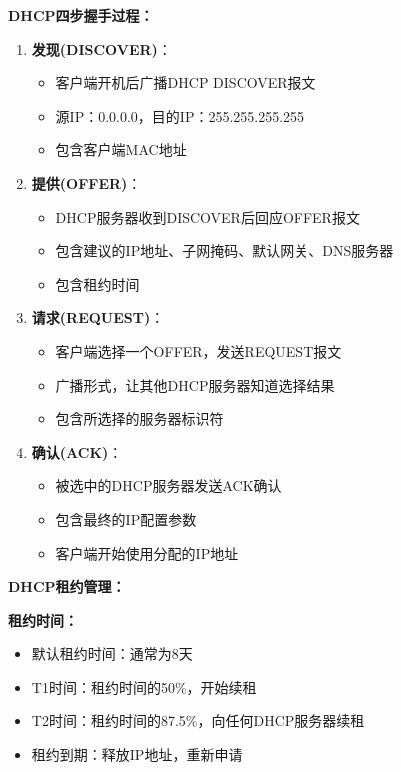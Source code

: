 \documentclass[lang=cn,newtx,10pt,scheme=chinese]{../../elegantbook}
\begin{document}
\textbf{DHCP四步握手过程：}
\begin{enumerate}
  \item \textbf{发现(DISCOVER)}：
    \begin{itemize}
      \item 客户端开机后广播DHCP DISCOVER报文
      \item 源IP：0.0.0.0，目的IP：255.255.255.255
      \item 包含客户端MAC地址
    \end{itemize}
    
  \item \textbf{提供(OFFER)}：
    \begin{itemize}
      \item DHCP服务器收到DISCOVER后回应OFFER报文
      \item 包含建议的IP地址、子网掩码、默认网关、DNS服务器
      \item 包含租约时间
    \end{itemize}
    
  \item \textbf{请求(REQUEST)}：
    \begin{itemize}
      \item 客户端选择一个OFFER，发送REQUEST报文
      \item 广播形式，让其他DHCP服务器知道选择结果
      \item 包含所选择的服务器标识符
    \end{itemize}
    
  \item \textbf{确认(ACK)}：
    \begin{itemize}
      \item 被选中的DHCP服务器发送ACK确认
      \item 包含最终的IP配置参数
      \item 客户端开始使用分配的IP地址
    \end{itemize}
\end{enumerate}

\textbf{DHCP租约管理：}

\textbf{租约时间：}
\begin{itemize}
  \item 默认租约时间：通常为8天
  \item T1时间：租约时间的50\%，开始续租
  \item T2时间：租约时间的87.5\%，向任何DHCP服务器续租
  \item 租约到期：释放IP地址，重新申请
\end{itemize}
\end{document}
